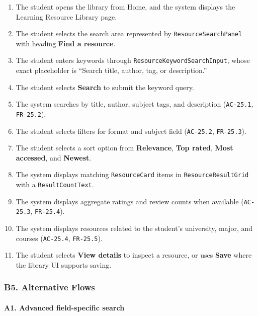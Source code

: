 \documentclass[12pt]{article}
\begin{document}
\begin{enumerate}
\item The student opens the library from Home, and the system displays the Learning Resource Library page.
\item The student selects the search area represented by \texttt{ResourceSearchPanel} with heading \textbf{Find a resource}.
\item The student enters keywords through \texttt{ResourceKeywordSearchInput}, whose exact placeholder is “Search title, author, tag, or description.”
\item The student selects \textbf{Search} to submit the keyword query.
\item The system searches by title, author, subject tags, and description (\texttt{AC-25.1}, \texttt{FR-25.2}).
\item The student selects filters for format and subject field (\texttt{AC-25.2}, \texttt{FR-25.3}).
\item The student selects a sort option from \textbf{Relevance}, \textbf{Top rated}, \textbf{Most accessed}, and \textbf{Newest}.
\item The system displays matching \texttt{ResourceCard} items in \texttt{ResourceResultGrid} with a \texttt{ResultCountText}.
\item The system displays aggregate ratings and review counts when available (\texttt{AC-25.3}, \texttt{FR-25.4}).
\item The system displays resources related to the student's university, major, and courses (\texttt{AC-25.4}, \texttt{FR-25.5}).
\item The student selects \textbf{View details} to inspect a resource, or uses \textbf{Save} where the library UI supports saving.
\end{enumerate}
\par\medskip

\hypertarget{sec:b5-alternative-flows}{}
\subsubsection*{B5. Alternative Flows}
\par\medskip

\hypertarget{sec:a1-advanced-field-specific-search}{}
\paragraph*{A1. Advanced field-specific search}
\par\medskip
\end{document}
